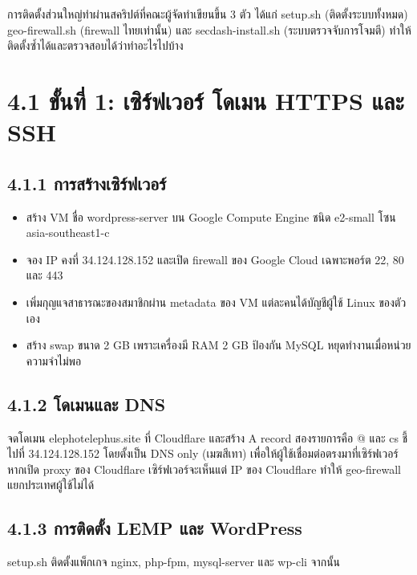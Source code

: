 
การติดตั้งส่วนใหญ่ทำผ่านสคริปต์ที่คณะผู้จัดทำเขียนขึ้น 3 ตัว ได้แก่ setup.sh (ติดตั้งระบบทั้งหมด) geo-firewall.sh (firewall ไทยเท่านั้น) และ secdash-install.sh (ระบบตรวจจับการโจมตี) ทำให้ติดตั้งซ้ำได้และตรวจสอบได้ว่าทำอะไรไปบ้าง

\section*{4.1 ขั้นที่ 1: เซิร์ฟเวอร์ โดเมน HTTPS และ SSH}

\subsection*{4.1.1 การสร้างเซิร์ฟเวอร์}

\begin{itemize}
\tightlist
\item
  สร้าง VM ชื่อ wordpress-server บน Google Compute Engine ชนิด e2-small โซน asia-southeast1-c
\item
  จอง IP คงที่ 34.124.128.152 และเปิด firewall ของ Google Cloud เฉพาะพอร์ต 22, 80 และ 443
\item
  เพิ่มกุญแจสาธารณะของสมาชิกผ่าน metadata ของ VM แต่ละคนได้บัญชีผู้ใช้ Linux ของตัวเอง
\item
  สร้าง swap ขนาด 2 GB เพราะเครื่องมี RAM 2 GB ป้องกัน MySQL หยุดทำงานเมื่อหน่วยความจำไม่พอ
\end{itemize}

\subsection*{4.1.2 โดเมนและ DNS}

จดโดเมน elephotelephus.site ที่ Cloudflare และสร้าง A record สองรายการคือ @ และ cs ชี้ไปที่ 34.124.128.152 โดยตั้งเป็น DNS only (เมฆสีเทา) เพื่อให้ผู้ใช้เชื่อมต่อตรงมาที่เซิร์ฟเวอร์ หากเปิด proxy ของ Cloudflare เซิร์ฟเวอร์จะเห็นแต่ IP ของ Cloudflare ทำให้ geo-firewall แยกประเทศผู้ใช้ไม่ได้

\subsection*{4.1.3 การติดตั้ง LEMP และ WordPress}

setup.sh ติดตั้งแพ็กเกจ nginx, php-fpm, mysql-server และ wp-cli จากนั้น

